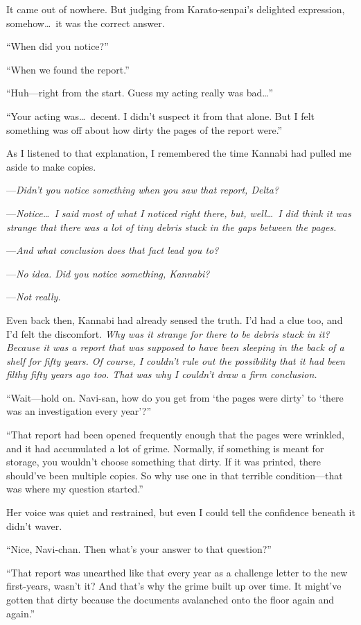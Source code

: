 \documentclass[
    a4paper,
    12pt,
    twoside,
    openany,
    UTF8,
    fontset=windows
]{ctexbook}
\begin{document}
It came out of nowhere. But judging from Karato-senpai's delighted expression, somehow\dots\ it was the correct answer.

``When did you notice?''

``When we found the report.''

``Huh---right from the start. Guess my acting really was bad\dots''

``Your acting was\dots\ decent. I didn't suspect it from that alone. But I felt something was off about how dirty the pages of the report were.''

As I listened to that explanation, I remembered the time Kannabi had pulled me aside to make copies.

---\textit{Didn't you notice something when you saw that report, Delta?}

---\textit{Notice\dots\ I said most of what I noticed right there, but, well\dots\ I did think it was strange that there was a lot of tiny debris stuck in the gaps between the pages.}

---\textit{And what conclusion does that fact lead you to?}

---\textit{No idea. Did you notice something, Kannabi?}

---\textit{Not really.}

Even back then, Kannabi had already sensed the truth. I'd had a clue too, and I'd felt the discomfort. \textit{Why was it strange for there to be debris stuck in it? Because it was a report that was supposed to have been sleeping in the back of a shelf for fifty years. Of course, I couldn't rule out the possibility that it had been filthy fifty years ago too. That was why I couldn't draw a firm conclusion.}

``Wait---hold on. Navi-san, how do you get from `the pages were dirty' to `there was an investigation every year'?''

``That report had been opened frequently enough that the pages were wrinkled, and it had accumulated a lot of grime. Normally, if something is meant for storage, you wouldn't choose something that dirty. If it was printed, there should've been multiple copies. So why use one in that terrible condition---that was where my question started.''

Her voice was quiet and restrained, but even I could tell the confidence beneath it didn't waver.

``Nice, Navi-chan. Then what's your answer to that question?''

``That report was unearthed like that every year as a challenge letter to the new first-years, wasn't it? And that's why the grime built up over time. It might've gotten that dirty because the documents avalanched onto the floor again and again.''
\end{document}
